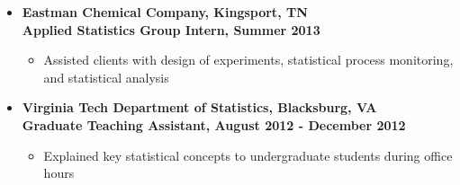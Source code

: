 \documentclass[10pt]{article}
\begin{document}
\begin{itemize}
\item[] \textbf{Eastman Chemical Company, Kingsport, TN\\
Applied Statistics Group Intern, Summer 2013}
\begin{itemize}
\item Assisted clients with design of experiments, statistical process monitoring, and statistical analysis
\end{itemize} 


\item[] \textbf{Virginia Tech Department of Statistics, Blacksburg, VA\\
Graduate Teaching Assistant, August 2012 - December 2012}
\begin{itemize}
\item Explained key statistical concepts to undergraduate students during office hours
\end{itemize}



%
%
\end{itemize}
\end{document}
